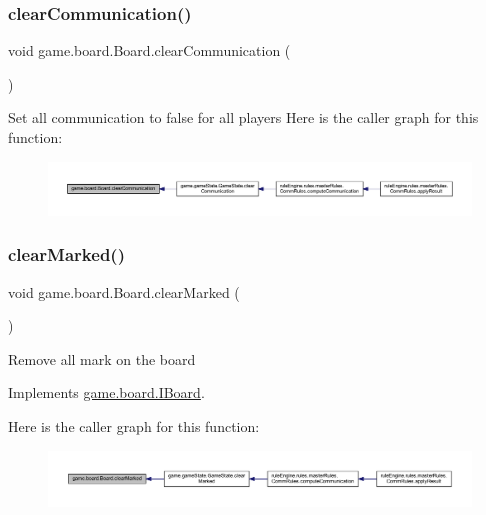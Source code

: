 \subsubsection{\texorpdfstring{clear\+Communication()}{clearCommunication()}}
{\footnotesize\ttfamily void game.\+board.\+Board.\+clear\+Communication (\begin{DoxyParamCaption}{ }\end{DoxyParamCaption})\hspace{0.3cm}{\ttfamily [inline]}}

Set all communication to false for all players Here is the caller graph for this function\+:
\nopagebreak
\begin{figure}[H]
\begin{center}
\leavevmode
\includegraphics[width=350pt]{classgame_1_1board_1_1_board_ab0f2fd4d06d165a3eb180023480f1421_icgraph}
\end{center}
\end{figure}
\mbox{\label{classgame_1_1board_1_1_board_acf5718b00471ceacee5182f1a214f124}} 
\subsubsection{\texorpdfstring{clear\+Marked()}{clearMarked()}}
{\footnotesize\ttfamily void game.\+board.\+Board.\+clear\+Marked (\begin{DoxyParamCaption}{ }\end{DoxyParamCaption})\hspace{0.3cm}{\ttfamily [inline]}}

Remove all mark on the board 

Implements \mbox{\hyperlink{interfacegame_1_1board_1_1_i_board_a070b6270c21257546f66b2df878fecc7}{game.\+board.\+I\+Board}}.

Here is the caller graph for this function\+:
\nopagebreak
\begin{figure}[H]
\begin{center}
\leavevmode
\includegraphics[width=350pt]{classgame_1_1board_1_1_board_acf5718b00471ceacee5182f1a214f124_icgraph}
\end{center}
\end{figure}
\mbox{\label{classgame_1_1board_1_1_board_a9c451f4c61b310a98999f4d6968bc6e1}} 
